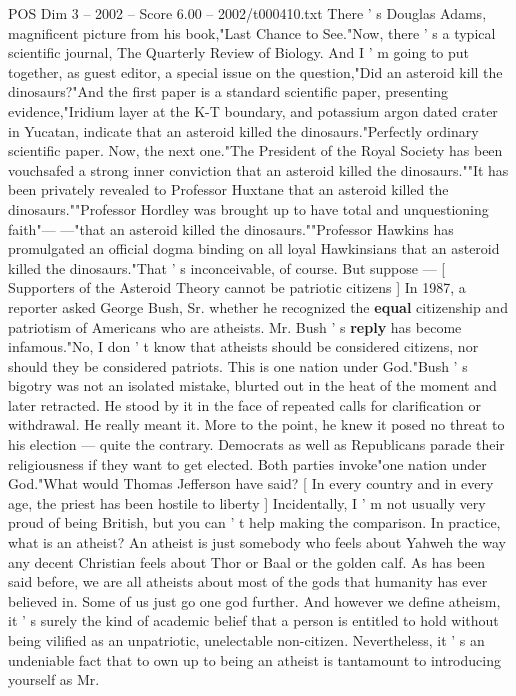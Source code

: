\begin{textsample}{POS Dim 3 – 2002 – Score 6.00 – 2002/t000410.txt}
There ' s Douglas Adams, magnificent picture from his book,"Last Chance to See."Now, there ' s a typical scientific journal, The Quarterly Review of Biology.
And I ' m going to put together, as guest editor, a special issue on the question,"Did an asteroid kill the dinosaurs?"And the first paper is a standard scientific paper, presenting evidence,"Iridium layer at the K-T boundary, and potassium argon dated crater in Yucatan, indicate that an asteroid killed the dinosaurs."Perfectly ordinary scientific paper.
Now, the next one."The President of the Royal Society has been vouchsafed a strong inner conviction that an asteroid killed the dinosaurs.""It has been privately revealed to Professor Huxtane that an asteroid killed the dinosaurs.""Professor Hordley was brought up to have total and unquestioning faith"— —"that an asteroid killed the dinosaurs.""Professor Hawkins has promulgated an official dogma binding on all loyal Hawkinsians that an asteroid killed the dinosaurs."That ' s inconceivable, of course.
But suppose — [ Supporters of the Asteroid Theory cannot be patriotic citizens ] In 1987, a reporter asked George Bush, Sr. whether he recognized the \textbf{equal} citizenship and patriotism of Americans who are atheists.
Mr.
Bush ' s \textbf{reply} has become infamous."No, I don ' t know that atheists should be considered citizens, nor should they be considered patriots.
This is one nation under God."Bush ' s bigotry was not an isolated mistake, blurted out in the heat of the moment and later retracted.
He stood by it in the face of repeated calls for clarification or withdrawal.
He really meant it.
More to the point, he knew it posed no threat to his election — quite the contrary.
Democrats as well as Republicans parade their religiousness if they want to get elected.
Both parties invoke"one nation under God."What would Thomas Jefferson have said? [ In every country and in every age, the priest has been hostile to liberty ] Incidentally, I ' m not usually very proud of being British, but you can ' t help making the comparison.
In practice, what is an atheist?
An atheist is just somebody who feels about Yahweh the way any decent Christian feels about Thor or Baal or the golden calf.
As has been said before, we are all atheists about most of the gods that humanity has ever believed in.
Some of us just go one god further.
And however we define atheism, it ' s surely the kind of academic belief that a person is entitled to hold without being vilified as an unpatriotic, unelectable non-citizen.
Nevertheless, it ' s an undeniable fact that to own up to being an atheist is tantamount to introducing yourself as Mr.

\end{textsample}
